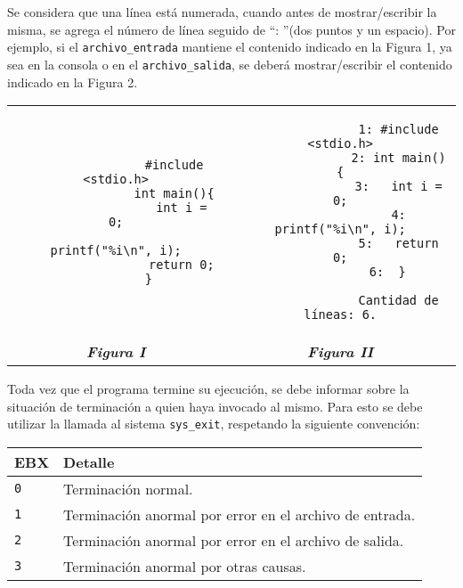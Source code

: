 \documentclass[12pt,a4paper]{article}
\begin{document}
Se considera que una línea está numerada, cuando antes de mostrar/escribir la misma, se agrega el número de línea seguido de ``: ''(dos puntos y un espacio). Por ejemplo, si el \texttt{archivo\_entrada} mantiene el contenido indicado en la Figura 1, ya sea en la consola o en el \texttt{archivo\_salida}, se deberá mostrar/escribir el contenido indicado en la Figura 2.

\newpage

\begin{center}
	\begin{tabular}[t]{c|c}
		\begin{minipage}[t]{0.45\textwidth}
			\begin{verbatim}
				#include <stdio.h>
				int main(){
				  int i = 0;
				  printf("%i\n", i);
				  return 0;
				}		
			\end{verbatim}
		\end{minipage} &
		\begin{minipage}[t]{0.45\textwidth}
			\begin{verbatim}
				1: #include <stdio.h>
				2: int main(){
				3:   int i = 0;
				4:   printf("%i\n", i);
				5:   return 0;
				6:  }	
				
				Cantidad de líneas: 6.

			\end{verbatim}
		\end{minipage} \\
		\textbf{\textit{Figura I}} & \textbf{\textit{Figura II}}
	\end{tabular}
\end{center}

Toda vez que el programa termine su ejecución, se debe informar sobre la situación de terminación a quien haya invocado al mismo. Para esto se debe utilizar la llamada al sistema \texttt{sys\_exit}, respetando la siguiente convención:
\begin{center}
	\begin{tabular}[t]{|l|l|}
		\hline \textbf{EBX} & \textbf{Detalle} \\ \hline
		\texttt{0} & Terminación normal. \\ \hline
		\texttt{1} & Terminación anormal por error en el archivo de entrada. \\ \hline
		\texttt{2} & Terminación anormal por error en el archivo de salida.\\ \hline
		\texttt{3} & Terminación anormal por otras causas.\\ \hline
	\end{tabular}
\end{center}
\end{document}
